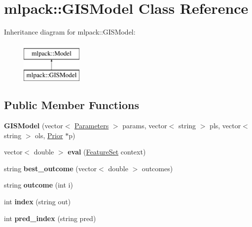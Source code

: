\hypertarget{classmlpack_1_1_g_i_s_model}{
\section{mlpack::GISModel Class Reference}
\label{classmlpack_1_1_g_i_s_model}
}
Inheritance diagram for mlpack::GISModel:\begin{figure}[H]
\begin{center}
\leavevmode
\includegraphics[height=2.000000cm]{classmlpack_1_1_g_i_s_model}
\end{center}
\end{figure}
\subsection*{Public Member Functions}
\begin{DoxyCompactItemize}
\item 
\hypertarget{classmlpack_1_1_g_i_s_model_a70b5617bb746965a114ce53f40994f97}{
{\bfseries GISModel} (vector$<$ \hyperlink{classmlpack_1_1_parameters}{Parameters} $>$ params, vector$<$ string $>$ pls, vector$<$ string $>$ ols, \hyperlink{classmlpack_1_1_prior}{Prior} $\ast$p)}
\label{classmlpack_1_1_g_i_s_model_a70b5617bb746965a114ce53f40994f97}

\item 
\hypertarget{classmlpack_1_1_g_i_s_model_a20df804c3af48f04a5064b01121eb241}{
vector$<$ double $>$ {\bfseries eval} (\hyperlink{structmlpack_1_1_feature_set}{FeatureSet} context)}
\label{classmlpack_1_1_g_i_s_model_a20df804c3af48f04a5064b01121eb241}

\item 
\hypertarget{classmlpack_1_1_g_i_s_model_ae231a7276c7b42cf82205570c1d6ecd9}{
string {\bfseries best\_\-outcome} (vector$<$ double $>$ outcomes)}
\label{classmlpack_1_1_g_i_s_model_ae231a7276c7b42cf82205570c1d6ecd9}

\item 
\hypertarget{classmlpack_1_1_g_i_s_model_a1c288157a87919c02c75cc7f3d60dca8}{
string {\bfseries outcome} (int i)}
\label{classmlpack_1_1_g_i_s_model_a1c288157a87919c02c75cc7f3d60dca8}

\item 
\hypertarget{classmlpack_1_1_g_i_s_model_afa224d21ba44eb9a5a47e2f9d75e0ad9}{
int {\bfseries index} (string out)}
\label{classmlpack_1_1_g_i_s_model_afa224d21ba44eb9a5a47e2f9d75e0ad9}

\item 
\hypertarget{classmlpack_1_1_g_i_s_model_a6a7fe5c4c7d8808cdaa55ad793135872}{
int {\bfseries pred\_\-index} (string pred)}
\label{classmlpack_1_1_g_i_s_model_a6a7fe5c4c7d8808cdaa55ad793135872}

\end{DoxyCompactItemize}
